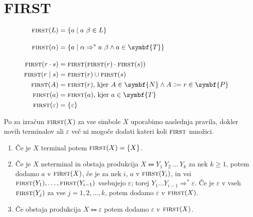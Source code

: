 \documentclass{report}
\newcommand{\Null}{\varepsilon}
\newcommand{\Seq}{\cdot}
\newcommand{\Spc}{\ }
\newcommand{\Union}{\mathrel{|}}
\newcommand{\Set}[1]{\symbf{#1}}
\newcommand{\FIRST}{\textsc{first}}
\newcommand{\Terminals}{\Set{T}}
\newcommand{\Productions}{\Set{P}}
\newcommand{\NonTerminals}{\Set{N}}
\newcommand{\Arrow}{\Coloneq}
\newlength{\arrow}
\newcommand{\DeriveStar}{\Rightarrow^\ast}
\newcommand{\NT}[1]{{#1}}
\newcommand{\T}[1]{{#1}}
\newcommand{\Sym}[1]{{#1}}
\begin{document}
    \section{FIRST}
    \begin{tcolorbox}[title={Definicija}]
      \begin{equation*}
        \begin{aligned}
          \FIRST(L) &= \{ \T{a} \mid \T{a} \Spc \beta \in L \}\\[1em]
          \FIRST(\alpha) &= \{\T{a} \mid \alpha \DeriveStar \T{a} \Spc \beta \land \T{a} \in \Terminals\}\\[1em]
          \FIRST(r \Seq s) &= \FIRST(\FIRST(r) \Seq \FIRST(s))\\
          \FIRST(r \Union s) &= \FIRST(r) \cup \FIRST(s)\\
          \FIRST(\NT{A}) &= \FIRST(r)\text{, kjer } \T{A} \in \NonTerminals \land \NT{A} \Arrow r \in \Productions\\
          \FIRST(\T{a}) &= \FIRST(\T{a})\text{, kjer } \T{a} \in \Terminals\\
          \FIRST(\Null) &= \{\Null\}\\
        \end{aligned}
      \end{equation*}
    \end{tcolorbox}

    Po \cite{dragonbook} za izračun $\FIRST(\Sym{X})$ za vse simbole $\Sym{X}$ uporabimo naslednja pravila, dokler novih terminalov ali $\Null$ več ni mogoče dodati kateri koli $\FIRST$ množici.

    \begin{enumerate}
      \item Če je $\Sym{X}$ terminal potem $\FIRST(\Sym{X}) = \{\Sym{X}\}$.
      \item Če je $\Sym{X}$ neterminal in obstaja produkcija $\Sym{X} \Arrow \Sym{Y}_1 \Spc \Sym{Y}_2 \Spc \dots \Spc \Sym{Y}_k$ za nek $k \geq 1$, potem dodamo $\T{a}$ v $\FIRST(\Sym{X})$, če je za nek $i$, $\T{a}$ v $\FIRST(\Sym{Y}_i)$, in vsi $\FIRST(\Sym{Y}_1), \dots, \FIRST(\Sym{Y}_{i - 1})$ vsebujejo $\Null$; torej $\Sym{Y}_1 \dots \Sym{Y}_{i - 1} \DeriveStar \Null$.
        Če je $\Null$ v vseh $\FIRST(\Sym{Y}_j)$ za vse $j = 1, 2, \dots, k$, potem dodamo $\Null$ v $\FIRST(\Sym{X})$.
      \item Če obstaja produkcija $\Sym{X} \Arrow \Null$ potem dodamo $\Null$ v $\FIRST(\Sym{X})$.
    \end{enumerate}
\end{document}

